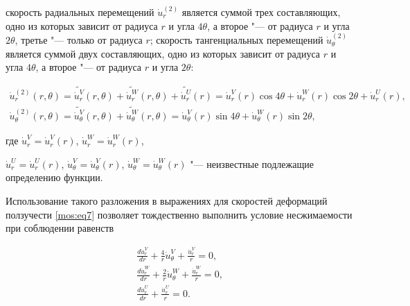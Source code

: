 скорость радиальных перемещений  $\displaystyle\dot{u}_{r}^{(2)}$ является суммой трех составляющих, одно из которых зависит от радиуса $r$ и угла $4\theta$, а второе "--- от радиуса $r$ и угла $2\theta$, третье "--- только от радиуса $r$; скорость тангенциальных перемещений $\displaystyle\dot{u}_{\theta}^{(2)}$ является суммой двух составляющих, одно из которых зависит от радиуса $r$ и угла $4\theta$, а второе "--- от радиуса $r$ и угла $2\theta$:

\begin{equation}

\label{mos:eq34}

\begin{array}{l}

\dot{u}_{r}^{(2)}(r,\theta)=\widetilde{\dot{u}^{V}_r}(r,\theta)+\widetilde{\dot{u}^{W}_r}(r,\theta)+\widetilde{\dot{u}^{U}_r}(r)

=\dot{u}^{V}_r(r) \cos{4 \theta} +\dot{u}^{W}_r(r) \cos{2 \theta} +\dot{u}^{U}_r(r),

\\  

\dot{u}_{\theta}^{(2)}(r,\theta)=\widetilde{\dot{u}_{\theta}^{V}}(r,\theta)+\widetilde{\dot{u}_{\theta}^{W}}(r,\theta)=

\dot{u}^{V}_{\theta}(r)\sin{4 \theta}+\dot{u}^{W}_{\theta}(r)\sin{2 \theta},

\end{array}

\end{equation}

где  $\dot{u}^{V}_r=\dot{u}^{V}_r(r)$,  $\dot{u}^{W}_r=\dot{u}^{W}_r(r)$, 

$\dot{u}^{U}_r=\dot{u}^{U}_r(r)$,  $\dot{u}^{V}_{\theta}=\dot{u}^{V}_{\theta}(r)$,  $\dot{u}^{W}_{\theta}=\dot{u}^{W}_{\theta}(r)$ "--- неизвестные подлежащие определению функции.



Использование такого разложения в выражениях для скоростей деформаций ползучести \eqref{mos:eq7} позволяет тождественно выполнить условие несжимаемости при соблюдении равенств

\begin{gather}

\label{mos:eq35}

\frac{d\dot{u}_{r}^{V}}{d r}+\frac{4}{r}{\dot{u}_{\theta}^{V}}+\frac{{\dot{u}_{r}^{V}}}{r}=0,

\\

\label{mos:eq36}

\frac{d\dot{u}_{r}^{W}}{d r}+\frac{2}{r}{\dot{u}_{\theta}^{W}}+\frac{{\dot{u}_{r}^{W}}}{r}=0,

\\

\label{mos:eq37}

\frac{d \dot{u}_{r}^{U}}{dr}+\frac{\dot{u}_{r}^{U}}{r}=0.

\end{gather}



